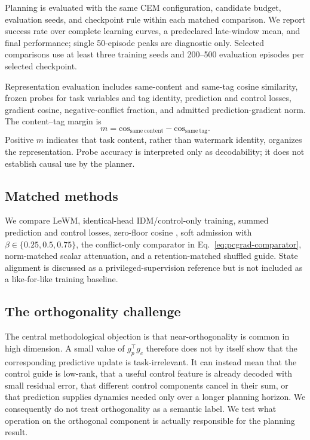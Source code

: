 Planning is evaluated with the same CEM configuration, candidate budget,
evaluation seeds, and checkpoint rule within each matched comparison.  We
report success rate over complete learning curves, a predeclared late-window
mean, and final performance; single 50-episode peaks are diagnostic only.
Selected comparisons use at least three training seeds and 200--500 evaluation
episodes per selected checkpoint.

Representation evaluation includes same-content and same-tag cosine
similarity, frozen probes for task variables and tag identity, prediction and
control losses, gradient cosine, negative-conflict fraction, and admitted
prediction-gradient norm.  The content--tag margin is
\begin{equation}
    m=\mathrm{cos}_{\mathrm{same\ content}}-
    \mathrm{cos}_{\mathrm{same\ tag}}.
\end{equation}
Positive $m$ indicates that task content, rather than watermark identity,
organizes the representation.  Probe accuracy is interpreted only as
decodability; it does not establish causal use by the planner.

\subsection{Matched methods}

We compare LeWM, identical-head IDM/control-only training, summed prediction
and control losses, zero-floor cosine \shortmethod{}, soft admission with
$\beta\in\{0.25,0.5,0.75\}$, the conflict-only comparator in
Eq.~\ref{eq:pcgrad-comparator}, norm-matched scalar attenuation, and a
retention-matched shuffled guide.  State alignment is discussed as a
privileged-supervision reference but is not included as a like-for-like
training baseline.

\subsection{The orthogonality challenge}
\label{sec:orthogonality-challenge}

The central methodological objection is that near-orthogonality is common in
high dimension.  A small value of $g_p^\top g_c$ therefore does not by itself
show that the corresponding predictive update is task-irrelevant.  It can
instead mean that the control guide is low-rank, that a useful control feature
is already decoded with small residual error, that different control
components cancel in their sum, or that prediction supplies dynamics needed
only over a longer planning horizon.  We consequently do not treat
orthogonality as a semantic label.  We test what operation on the orthogonal
component is actually responsible for the planning result.

